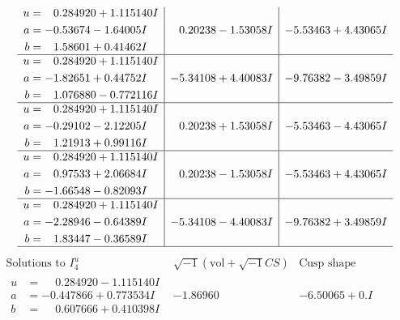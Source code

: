 \documentclass[1p]{elsarticle_modified}
\theoremstyle{definition}
\newcommand{\I}{\sqrt{-1}}
\begin{document}
$$\begin{array}{c|c|c}
\begin{aligned}
u &= \phantom{-}0.284920 + 1.115140 I \\
a &= -0.53674 - 1.64005 I \\
b &= \phantom{-}1.58601 + 0.41462 I\end{aligned}
 & \phantom{-}0.20238 - 1.53058 I & -5.53463 + 4.43065 I \\ \hline\begin{aligned}
u &= \phantom{-}0.284920 + 1.115140 I \\
a &= -1.82651 + 0.44752 I \\
b &= \phantom{-}1.076880 - 0.772116 I\end{aligned}
 & -5.34108 + 4.40083 I & -9.76382 - 3.49859 I \\ \hline\begin{aligned}
u &= \phantom{-}0.284920 + 1.115140 I \\
a &= -0.29102 - 2.12205 I \\
b &= \phantom{-}1.21913 + 0.99116 I\end{aligned}
 & \phantom{-}0.20238 + 1.53058 I & -5.53463 - 4.43065 I \\ \hline\begin{aligned}
u &= \phantom{-}0.284920 + 1.115140 I \\
a &= \phantom{-}0.97533 + 2.06684 I \\
b &= -1.66548 - 0.82093 I\end{aligned}
 & \phantom{-}0.20238 - 1.53058 I & -5.53463 + 4.43065 I \\ \hline\begin{aligned}
u &= \phantom{-}0.284920 + 1.115140 I \\
a &= -2.28946 - 0.64389 I \\
b &= \phantom{-}1.83447 - 0.36589 I\end{aligned}
 & -5.34108 - 4.40083 I & -9.76382 + 3.49859 I\\
 \hline 
 \end{array}$$\newpage$$\begin{array}{c|c|c}  
\text{Solutions to }I^u_{4}& \I (\text{vol} + \sqrt{-1}CS) & \text{Cusp shape}\\
 \hline 
\begin{aligned}
u &= \phantom{-}0.284920 - 1.115140 I \\
a &= -0.447866 + 0.773534 I \\
b &= \phantom{-}0.607666 + 0.410398 I\end{aligned}
 & -1.86960\phantom{ +0.000000I} & -6.50065 + 0. I\phantom{ +0.000000I} \\ \hline\begin{aligned}

\end{aligned}
\end{array}$$
\end{document}
